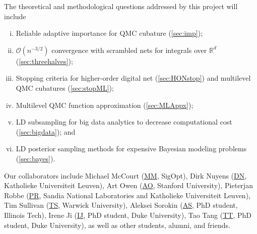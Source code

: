 \documentclass[11pt]{NSFamsart}
\newcommand{\cmtS}[1]{{\color{blue}{(Simon: #1)}}}
\newcommand{\AO}{\hyperlink{AOlink}{AO}\xspace}
\newcommand{\MM}{\hyperlink{MMlink}{MM}\xspace}
\newcommand{\TS}{\hyperlink{TSlink}{TS}\xspace}
\newcommand{\IJi}{\hyperlink{IJlink}{IJ}\xspace}
\newcommand{\TT}{\hyperlink{TTlink}{TT}\xspace}
\newcommand{\AS}{\hyperlink{ASlink}{AS}\xspace}
\newcommand{\PR}{\hyperlink{PRlink}{PR}\xspace}
\newcommand{\DN}{\hyperlink{DNlink}{DN}\xspace}
\newcommand{\reals}{{\mathbb{R}}}
\newcommand{\Order}{\mathcal{O}}
\begin{document}
The theoretical and methodological questions addressed by this project will include \cmtS{to modify, move later into Section 1? and have this has a one-paragraph abstract on the overarching framework \& broader impacts?}
\begin{enumerate}[i)]
\item Reliable adaptive importance for QMC cubature (\cref{sec:imp});
\item $\Order(n^{-3/2})$ convergence with scrambled nets for integrals over $\reals^d$ (\cref{sec:threehalves});
\item Stopping criteria for higher-order digital net (\cref{sec:HONstop}) and multilevel QMC cubatures (\cref{sec:stopML});
\item Multilevel QMC function approximation (\cref{sec:MLAppx});
\item LD subsampling for big data analytics to decrease computational cost (\cref{sec:bigdata}); and
\item LD posterior sampling methods for expensive Bayesian modeling problems (\cref{sec:bayes}).
\end{enumerate}

Our collaborators include  
\hypertarget{MMlink}{Michael McCourt} (\MM, SigOpt), 
\hypertarget{DNlink}{Dirk Nuyens} (\DN,  Katholieke Universiteit Leuven),
\hypertarget{AOlink}{Art Owen} (\AO, Stanford University), 
\hypertarget{PRlink}{Pieterjan Robbe} (\PR, Sandia National Laboratories and Katholieke Universiteit Leuven),  
\hypertarget{TSlink}{Tim Sullivan} (\TS, Warwick University), 
\hypertarget{ASlink}{Aleksei Sorokin} (\AS, PhD student, Illinois Tech),
\hypertarget{IJlink}{Irene Ji} (\IJi, PhD student, Duke University), 
\hypertarget{TTlink}{Tao Tang} (\TT, PhD student, Duke University), as well as other students, alumni, and friends. \cmtS{to modify}





\end{document}
